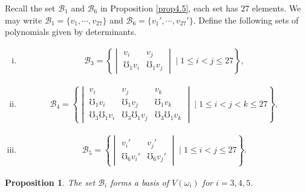\documentclass[12pt]{article}
\numberwithin{equation}{section}
\newtheorem{proposition}[theorem]{Proposition}
\theoremstyle{definition}
\theoremstyle{remark}
\begin{document}
Recall the set $\mathcal{B}_1$ and $\mathcal{B}_6$ in Proposition \ref{prop4.5}, each set has $27$ elements. 
We may write $\mathcal{B}_1=\{v_1,\cdots,v_{27}\}$ and $\mathcal{B}_6=\{v_1',\cdots,v_{27}'\}$.
Define the following sets of polynomials given by determinants.
\begin{enumerate}[(i)]
	\item 
	\begin{eqnarray}
		\mathcal{B}_3=\left\lbrace \begin{vmatrix}
			v_i&v_j\\ \mho_1v_i&\mho_1v_j
		\end{vmatrix} \mid 1\leqslant i< j\leqslant 27\right\rbrace, 
	\end{eqnarray}
	\item 
	\begin{eqnarray}
		\mathcal{B}_4=\left\lbrace \begin{vmatrix}
			v_i&v_j&v_k\\ \mho_1v_i&\mho_1v_j&\mho_1v_k \\ \mho_3\mho_1v_i&\mho_3\mho_1v_j&\mho_3\mho_1v_k
		\end{vmatrix} \mid 1\leqslant i<j<k\leqslant 27\right\rbrace,
	\end{eqnarray}
	\item 
	\begin{eqnarray}
		\mathcal{B}_5=\left\lbrace \begin{vmatrix}
			v_i'&v_j'\\ \mho_6v_i'&\mho_6v_j'
		\end{vmatrix} \mid 1\leqslant i<j\leqslant 27\right\rbrace. 
	\end{eqnarray}
\end{enumerate}
\begin{proposition}
	The set $\mathcal{B}_i$ forms a basis of $V(\omega_i)$ for $i=3,4,5$.
\end{proposition}
\end{document}
